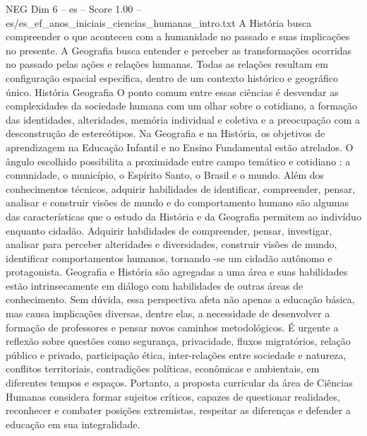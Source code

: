 \begin{textsample}{NEG Dim 6 – es – Score 1.00 – es/es\_ef\_anos\_iniciais\_ciencias\_humanas\_intro.txt}
A História busca compreender o que aconteceu com a humanidade no passado e suas implicações no presente.
A Geografia busca entender e perceber as transformações ocorridas no passado pelas ações e relações humanas.
Todas as relações resultam em configuração espacial específica, dentro de um contexto histórico e geográfico único.
História Geografia O ponto comum entre essas ciências é desvendar as complexidades da sociedade humana com um olhar sobre o cotidiano, a formação das identidades, alteridades, memória individual e coletiva e a preocupação com a desconstrução de estereótipos.
Na Geografia e na História, os objetivos de aprendizagem na Educação Infantil e no Ensino Fundamental estão atrelados.
O ângulo escolhido possibilita a proximidade entre campo temático e cotidiano : a comunidade, o município, o Espírito Santo, o Brasil e o mundo.
Além dos conhecimentos técnicos, adquirir habilidades de identificar, compreender, pensar, analisar e construir visões de mundo e do comportamento humano são algumas das características que o estudo da História e da Geografia permitem ao indivíduo enquanto cidadão.
Adquirir habilidades de compreender, pensar, investigar, analisar para perceber alteridades e diversidades, construir visões de mundo, identificar comportamentos humanos, tornando -se um cidadão autônomo e protagonista.
Geografia e História são agregadas a uma área e suas habilidades estão intrinsecamente em diálogo com habilidades de outras áreas de conhecimento.
Sem dúvida, essa perspectiva afeta não apenas a educação básica, mas causa implicações diversas, dentre elas, a necessidade de desenvolver a formação de professores e pensar novos caminhos metodológicos.
É urgente a reflexão sobre questões como segurança, privacidade, fluxos migratórios, relação público e privado, participação ética, inter-relações entre sociedade e natureza, conflitos territoriais, contradições políticas, econômicas e ambientais, em diferentes tempos e espaços.
Portanto, a proposta curricular da área de Ciências Humanas considera formar sujeitos críticos, capazes de questionar realidades, reconhecer e combater posições extremistas, respeitar as diferenças e defender a educação em sua integralidade.

\end{textsample}
